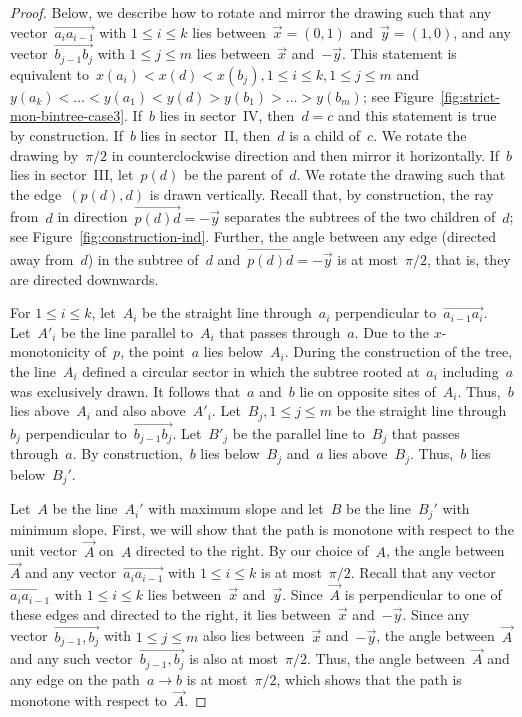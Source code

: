 \documentclass[a4paper,11pt]{article}
\theoremstyle{plain}
\begin{document}
\begin{proof}
    Below, we describe how to rotate and mirror the drawing such that
    any vector~$\overrightarrow{a_ia_{i-1}}$ with $1\le i\le k$ lies
    between~$\vec x=(0,1)$ and~$\vec y=(1,0)$, and any
    vector~$\overrightarrow{b_{j-1}b_j}$ with $1\le j\le m$ lies
    between~$\vec x$ and~$-\vec y$. This statement is equivalent
    to~$x(a_i)<x(d)<x(b_j),1\le i\le k,1\le j\le m$
    and~$y(a_k)<\ldots<y(a_1)<y(d)>y(b_1)>\ldots>y(b_m)$;
    see Figure~\ref{fig:strict-mon-bintree-case3}.
    If~$b$ lies in sector~IV, then~$d=c$ and this statement is true by
    construction. If~$b$ lies in sector~II, then~$d$ is a child
    of~$c$. We rotate the drawing by~$\pi/2$ in counterclockwise
    direction and then mirror it horizontally.
    If~$b$ lies in sector~III, let~$p(d)$ be the parent of~$d$. 
    We rotate the drawing such that the edge~$(p(d),d)$ is drawn vertically. 
    Recall that, by construction, the ray from~$d$ in 
    direction~$\overrightarrow{p(d)d}=-\vec y$ separates the subtrees of the two  
    children of~$d$; see Figure~\ref{fig:construction-ind}. Further, the angle 
    between any edge (directed away from~$d$) in the subtree of~$d$ 
    and~$\overrightarrow{p(d)d}=-\vec y$ is at most~$\pi/2$, that is, they are 
    directed downwards.
   
    For $1 \le i \le k$, let~$A_i$ be the straight line through~$a_i$ perpendicular 
    to~$\overrightarrow{a_{i-1}a_i}$. Let~$A'_i$ be the line parallel to~$A_i$ 
    that passes through~$a$. Due to the $x$-monotonicity of~$p$, the point~$a$ 
    lies below~$A_i$. During the construction of the tree, the line~$A_i$
    defined a circular sector in which the subtree rooted at~$a_i$ including~$a$ 
    was exclusively drawn. It follows that~$a$ and~$b$ lie on opposite sites 
    of~$A_i$. Thus,~$b$ lies above~$A_i$ and also above~$A'_i$. 
    Let~$B_j,1\le j\le m$ be the straight line through~$b_j$ perpendicular 
    to~$\overrightarrow{b_{j-1}b_j}$. Let~$B'_j$ be the parallel line to~$B_j$ 
    that passes through~$a$. By construction,~$b$ lies below~$B_j$ and~$a$ lies
    above~$B_j$. Thus,~$b$ lies below~$B_j'$.
    
    Let~$A$ be the line~$A_i'$ with maximum slope and let~$B$ be the line~$B_j'$
    with minimum slope. First, we will show that the path is monotone with 
    respect to the unit vector~$\vec A$ on~$A$ directed to the right. By our choice 
    of~$A$, the angle between $\vec A$ and any vector~$\overrightarrow{a_ia_{i-1}}$
    with $1\le i\le k$
    is at most~$\pi/2$. Recall that any vector~$\overrightarrow{a_ia_{i-1}}$
    with $1\le i\le k$ lies between~$\vec x$ and~$\vec y$. Since~$\vec A$ is 
    perpendicular to one of these edges and directed to the right, it lies 
    between~$\vec x$ and~$-\vec y$. Since any 
    vector~$\overrightarrow{b_{j-1},b_j}$ with $1\le j\le m$ also lies 
    between~$\vec x$ and~$-\vec y$, the angle between~$\vec A$ and
    any such vector~$\overrightarrow{b_{j-1},b_j}$
    is also at most~$\pi/2$. Thus, the angle between~$\vec A$ and any edge on the
    path~$a\to b$ is at most~$\pi/2$, which shows that the path is monotone with respect 
    to~$\vec A$.
    

\end{proof}
\end{document}
